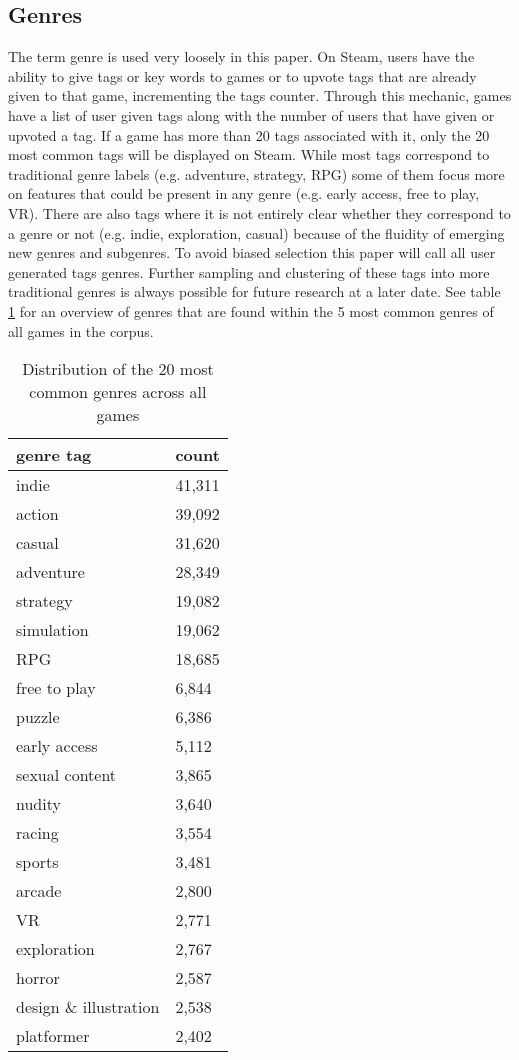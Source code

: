 \documentclass[11pt, a4paper]{article}
\begin{document}
\subsection{Genres}
The term genre is used very loosely in this paper. On Steam, users have the ability to give tags or key words to games or to upvote tags that are already given to that game, incrementing the tags counter. Through this mechanic, games have a list of user given tags along with the number of users that have given or upvoted a tag. If a game has more than 20 tags associated with it, only the 20 most common tags will be displayed on Steam. While most tags correspond to traditional genre labels (e.g. adventure, strategy, RPG) some of them focus more on features that could be present in any genre (e.g. early access, free to play, VR). There are also tags where it is not entirely clear whether they correspond to a genre or not (e.g. indie, exploration, casual) because of the fluidity of emerging new genres and subgenres. To avoid biased selection this paper will call all user generated tags genres. Further sampling and clustering of these tags into more traditional genres is always possible for future research at a later date. See table \ref{tab:genre_metrics} for an overview of genres that are found within the 5 most common genres of all games in the corpus. 
\begin{table}[h]
    \centering
    \begin{tabular}{l|l}
    genre tag & count\\\hline
        indie & 41,311 \\
        action & 39,092 \\
        casual & 31,620 \\
        adventure & 28,349 \\
        strategy & 19,082 \\
        simulation & 19,062 \\
        RPG & 18,685 \\
        free to play & 6,844 \\
        puzzle & 6,386 \\
        early access & 5,112 \\
        sexual content & 3,865 \\
        nudity & 3,640 \\
        racing & 3,554 \\
        sports & 3,481 \\
        arcade & 2,800 \\
        VR & 2,771 \\
        exploration & 2,767 \\
        horror & 2,587 \\
        design \& illustration & 2,538 \\
        platformer & 2,402
    \end{tabular}
    \caption{Distribution of the 20 most common genres across all games}
    \label{tab:genre_metrics}
\end{table}
\end{document}
